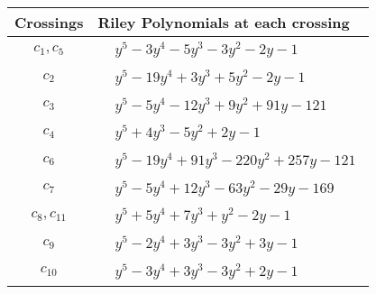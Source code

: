 \documentclass[1p]{elsarticle_modified}
\theoremstyle{definition}
\begin{document}
\begin{tabular}{m{50pt}|m{274pt}}
Crossings & \hspace{64pt}Riley Polynomials at each crossing \\
\hline $$\begin{aligned}c_{1},c_{5}\end{aligned}$$&$\begin{aligned}
&y^5-3 y^4-5 y^3-3 y^2-2 y-1
\end{aligned}$\\
\hline $$\begin{aligned}c_{2}\end{aligned}$$&$\begin{aligned}
&y^5-19 y^4+3 y^3+5 y^2-2 y-1
\end{aligned}$\\
\hline $$\begin{aligned}c_{3}\end{aligned}$$&$\begin{aligned}
&y^5-5 y^4-12 y^3+9 y^2+91 y-121
\end{aligned}$\\
\hline $$\begin{aligned}c_{4}\end{aligned}$$&$\begin{aligned}
&y^5+4 y^3-5 y^2+2 y-1
\end{aligned}$\\
\hline $$\begin{aligned}c_{6}\end{aligned}$$&$\begin{aligned}
&y^5-19 y^4+91 y^3-220 y^2+257 y-121
\end{aligned}$\\
\hline $$\begin{aligned}c_{7}\end{aligned}$$&$\begin{aligned}
&y^5-5 y^4+12 y^3-63 y^2-29 y-169
\end{aligned}$\\
\hline $$\begin{aligned}c_{8},c_{11}\end{aligned}$$&$\begin{aligned}
&y^5+5 y^4+7 y^3+y^2-2 y-1
\end{aligned}$\\
\hline $$\begin{aligned}c_{9}\end{aligned}$$&$\begin{aligned}
&y^5-2 y^4+3 y^3-3 y^2+3 y-1
\end{aligned}$\\
\hline $$\begin{aligned}c_{10}\end{aligned}$$&$\begin{aligned}
&y^5-3 y^4+3 y^3-3 y^2+2 y-1
\end{aligned}$\\
\hline
\end{tabular}\\~\\
\end{document}
